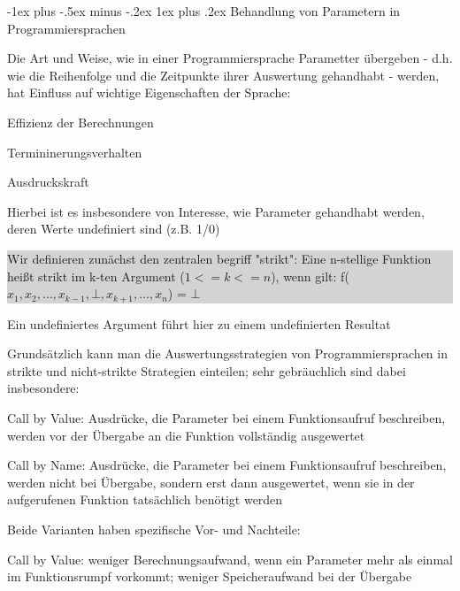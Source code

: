 \documentclass[10pt]{article}
\makeatletter
\renewcommand{\subsubsection}{\@startsection{subsubsection}{3}{0mm}%
                                {-1ex plus -.5ex minus -.2ex}%
                                {1ex plus .2ex}%
                                {\normalfont\small\bfseries}}
\makeatother
\begin{document}
\begin{itemize*}
\subsubsection{Behandlung von Parametern in Programmiersprachen}
\begin{itemize*}
  \item Die Art und Weise, wie in einer Programmiersprache Parametter übergeben - d.h. wie die Reihenfolge und die Zeitpunkte ihrer Auswertung gehandhabt - werden, hat Einfluss auf wichtige Eigenschaften der Sprache:
  \begin{itemize*}
    \item Effizienz der Berechnungen
    \item Termininerungsverhalten
    \item Ausdruckskraft
  \end{itemize*}
  \item Hierbei ist es insbesondere von Interesse, wie Parameter gehandhabt werden, deren Werte undefiniert sind (z.B. 1/0)\newline
  \colorbox{lightgray}{
    \begin{minipage}[h]{1.0\linewidth}
      Wir definieren zunächst den zentralen begriff "strikt": \newline Eine n-stellige Funktion heißt strikt im k-ten Argument ($1<=k<=n$), wenn gilt: f($x_1,x_2,…,x_{k-1},\bot,x_{k+1},…,x_n$) = $\bot$
    \end{minipage}}
  \item Ein undefiniertes Argument führt hier zu einem undefinierten Resultat
  \item Grundsätzlich kann man die Auswertungsstrategien von Programmiersprachen in strikte und nicht-strikte Strategien einteilen; sehr gebräuchlich sind dabei insbesondere:
  \begin{itemize*}
    \item Call by Value: Ausdrücke, die Parameter bei einem Funktionsaufruf beschreiben, werden vor der Übergabe an die Funktion vollständig ausgewertet
    \item Call by Name: Ausdrücke, die Parameter bei einem Funktionsaufruf beschreiben, werden nicht bei Übergabe, sondern erst dann ausgewertet, wenn sie in der aufgerufenen Funktion tatsächlich benötigt werden
  \end{itemize*}
  \item Beide Varianten haben spezifische Vor- und Nachteile:
  \begin{itemize*}
    \item Call by Value: weniger Berechnungsaufwand, wenn ein Parameter mehr als einmal im Funktionsrumpf vorkommt; weniger Speicheraufwand bei der Übergabe

\end{itemize*}
\end{itemize*}
\end{itemize*}
\end{document}
